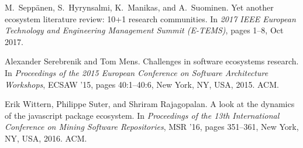 \documentclass[10pt,conference]{IEEEtran}
\begin{document}
\begin{thebibliography}{10}
  M.~{Seppänen}, S.~{Hyrynsalmi}, K.~{Manikas}, and A.~{Suominen}.
  \newblock Yet another ecosystem literature review: 10+1 research communities.
  \newblock In {\em 2017 IEEE European Technology and Engineering Management
    Summit (E-TEMS)}, pages 1--8, Oct 2017.
  
  Alexander Serebrenik and Tom Mens.
  \newblock Challenges in software ecosystems research.
  \newblock In {\em Proceedings of the 2015 European Conference on Software
    Architecture Workshops}, ECSAW '15, pages 40:1--40:6, New York, NY, USA,
    2015. ACM.
  
  Erik Wittern, Philippe Suter, and Shriram Rajagopalan.
  \newblock A look at the dynamics of the javascript package ecosystem.
  \newblock In {\em Proceedings of the 13th International Conference on Mining
    Software Repositories}, MSR '16, pages 351--361, New York, NY, USA, 2016.
    ACM.

\end{thebibliography}

\vspace{12pt}
\end{document}

